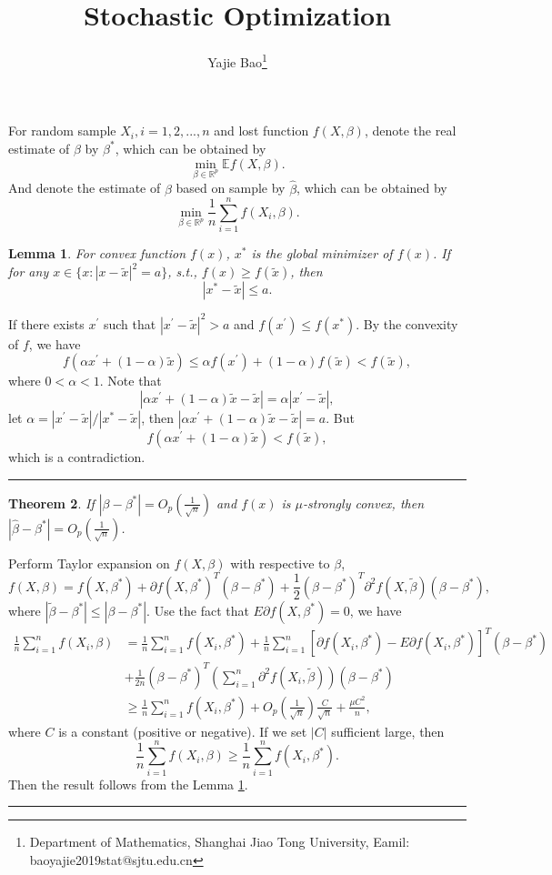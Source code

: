 \documentclass[12pt]{article}
\numberwithin{equation}{section}
\newtheorem{theorem}{Theorem}[section]
\newtheorem{lemma}[theorem]{Lemma}
\newenvironment{proof}{{\bf Proof:}}{\hfill\rule{2mm}{2mm}}
\begin{document}
\title{Stochastic Optimization}

\author{Yajie Bao\thanks{Department of Mathematics, Shanghai Jiao Tong University, Eamil: baoyajie2019stat@sjtu.edu.cn}}
\maketitle
For random sample $X_i,i=1,2,...,n$ and lost function $f(X,\beta)$, denote the real estimate of $\beta$ by $\beta^{*}$, which can be obtained by
$$
\min_{\beta \in \mathbb R^p} \mathbb Ef(X,\beta).
$$
And denote the estimate of $\beta$ based on sample by $\hat \beta$, which can be obtained by
$$
\min_{\beta \in \mathbb R^p}\frac{1}{n}\sum_{i=1}^nf(X_i,\beta).
$$
\begin{lemma}\label{lemma 5.1}
	For convex function $f(x)$, $x^{*}$ is the global minimizer of $f(x)$. If for any $x \in \{x:|x-\tilde x|^2= a\}$, s.t., $f(x)\geq f(\tilde x)$, then
	$$
	|x^{*}-\tilde x|\leq a.
	$$
\end{lemma}
\begin{proof}
	If there exists $x^{'}$ such that $|x^{'}-\tilde x|^2>a$ and $f(x^{'})\leq f(x^{*})$. By the convexity of $f$, we have 
	$$
	f(\alpha x^{'}+(1-\alpha) \tilde x)\leq \alpha f(x^{'})+(1-\alpha)f(\tilde x)< f(\tilde x),
	$$
	where $0<\alpha<1$. Note that
	$$|\alpha x^{'}+(1-\alpha) \tilde x-\tilde x|=\alpha|x^{'}-\tilde x|,$$
	let $\alpha=|x^{'}-\tilde x|/|x^{*}-\tilde x|$, then $|\alpha x^{'}+(1-\alpha) \tilde x-\tilde x|=a$. But
	$$
	f(\alpha x^{'}+(1-\alpha) \tilde x)< f(\tilde x),
	$$
	which is a contradiction.
\end{proof}

\begin{theorem}
	If $|\beta-\beta^{*}|=O_p(\frac{1}{\sqrt n})$ and $f(x)$ is $\mu$-strongly convex, then $|\hat \beta-\beta^{*}|=O_p(\frac{1}{\sqrt n})$.
\end{theorem} 
\begin{proof}
	Perform Taylor expansion on $f(X,\beta)$ with respective to $\beta$,
	$$
	f(X,\beta)=f(X,\beta^{*})+\partial f(X,\beta^{*})^{T}(\beta-\beta^{*})+\frac{1}{2} (\beta-\beta^{*})^{T}\partial^2 f(X,\tilde\beta)(\beta-\beta^{*}),
	$$
	where $|\tilde \beta-\beta ^{*}|\leq |\beta-\beta^{*}|$. Use the fact that $E\partial f(X,\beta^{*})=0$, we have
	$$
	\begin{aligned}
	\frac{1}{n}\sum_{i=1}^nf(X_i,\beta)&=\frac{1}{n}\sum_{i=1}^nf(X_i,\beta^{*})+\frac{1}{n}\sum_{i=1}^n\left[\partial f(X_i,\beta^{*})-E\partial f(X_i,\beta^{*})\right]^{T}(\beta-\beta^{*})\\
	&+\frac{1}{2n}(\beta-\beta^{*})^{T}\left(\sum_{i=1}^n \partial^2 f(X_i,\tilde\beta)\right)(\beta-\beta^{*})\\
	&\geq \frac{1}{n}\sum_{i=1}^nf(X_i,\beta^{*})+O_p(\frac{1}{\sqrt n})\frac{C}{\sqrt n}+\frac{\mu C^2}{n},
	\end{aligned}
	$$
	where $C$ is a constant (positive or negative). If we set $|C|$ sufficient large, then 
	$$
	\frac{1}{n}\sum_{i=1}^nf(X_i,\beta)\geq \frac{1}{n}\sum_{i=1}^nf(X_i,\beta^{*}).
	$$
	Then the result follows from the Lemma \ref{lemma 5.1}.
\end{proof}
\end{document}
